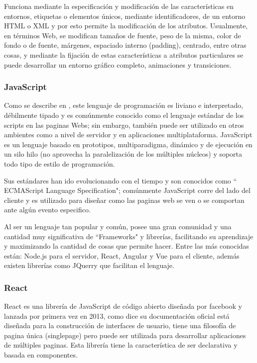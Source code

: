Funciona mediante la especificación y modificación de las características en
entornos, etiquetas o elementos únicos, mediante identificadores, de un entorno
HTML o XML y por esto permite la modificación de los atributos.
Usualmente, en términos Web, se modifican tamaños de fuente, peso de la misma,
color de fondo o de fuente, márgenes, espaciado interno (padding), centrado,
entre otras cosas, y mediante la fijación de estas características a atributos
particulares se puede desarrollar un entorno gráfico completo, animaciones y
transiciones.

\subsubsection{JavaScript}

Como se describe en \cite{JavaScript}, este lenguaje de programación es liviano e
interpretado, débilmente tipado y es comúnmente conocido como el lenguaje estándar
de los scripts en las paginas Webs; sin embargo, también puede ser utilizado en
otros ambientes como a nivel de servidor y en aplicaciones multiplataforma.
JavaScript es un lenguaje basado en prototipos, multiparadigma, dinámico y de
ejecución en un silo hilo (no aprovecha la paralelización de los múltiples
núcleos) y soporta todo tipo de estilo de programación.

Sus estándares han ido evolucionando con el tiempo y son conocidos como
`` ECMAScript Language Specification"; comúnmente JavaScript corre del lado del
cliente y es utilizado para diseñar como las paginas web se ven o se comportan
ante algún evento especifico.

Al ser un lenguaje tan popular y común, posee una gran comunidad y una cantidad
muy significativa de ``Frameworks"  y librerías, facilitando su aprendizaje
y maximizando la cantidad de cosas que permite hacer. Entre las más conocidas
están: Node.js para el servidor, React, Angular y Vue para el cliente, además
existen librerías como JQuerry que facilitan el lenguaje.

\subsubsection{React}

React es una librería de JavaScript de código abierto diseñada por facebook y
lanzada por primera vez en 2013, como dice su documentación oficial \cite{React}
está diseñada para la construcción de interfaces de usuario, tiene una filosofía
de pagina única (singlepage) pero puede ser utilizada para desarrollar aplicaciones
de múltiples paginas. Esta librería tiene la característica de ser declarativa
y basada en componentes.

